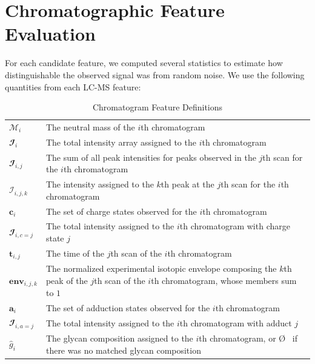 \documentclass{article}
\begin{document}
\section{Chromatographic Feature Evaluation}\label{sec:feature_evaluation}
    For each candidate feature, we computed several statistics to estimate how distinguishable
    the observed signal was from random noise. We use the following quantities from each LC-MS
    feature:

    \renewcommand{\arraystretch}{1.5}
    \begin{table}
        \caption{Chromatogram Feature Definitions}\label{tbl:chromatogram_feature_definitions}
        \centering
        \begin{tabular}{l | p{9cm}}
            \hline
            $\mathcal{M}_i$ & The neutral mass of the $i$th chromatogram\\
            $\mathbfcal{I}_i$ & The total intensity array assigned to the $i$th chromatogram\\
            $\mathbfcal{I}_{i, j}$ & The sum of all peak intensities for peaks observed in
                                             the $j$th scan for the $i$th chromatogram\\
            $\mathcal{I}_{i, j, k}$ & The intensity assigned to the $k$th peak at the $j$th
                                      scan for the $i$th chromatogram\\
            $\mathbf{c}_i$ & The set of charge states observed for the $i$th chromatogram\\
            $\mathbfcal{I}_{i, c=j}$ & The total intensity assigned to the $i$th chromatogram
                                     with charge state $j$\\
            $\mathbf{t}_{i, j}$ & The time of the $j$th scan of the $i$th chromatogram\\
            $\textbf{env}_{i, j, k}$ & The normalized experimental isotopic envelope composing
                                     the $k$th peak of the $j$th scan of the $i$th chromatogram,
                                     whose members sum to $1$\\
            $\mathbf{a}_i$ & The set of adduction states observed for the $i$th chromatogram\\
            $\mathbfcal{I}_{i, a=j}$ & The total intensity assigned to the $i$th
                                                 chromatogram with adduct $j$\\
            ${\hat g}_i$ & The glycan composition assigned to the $i$th chromatogram, or \O
                           \ if there was no matched glycan composition
        \end{tabular}
    \end{table}
    \renewcommand{\arraystretch}{1.0}
\end{document}

